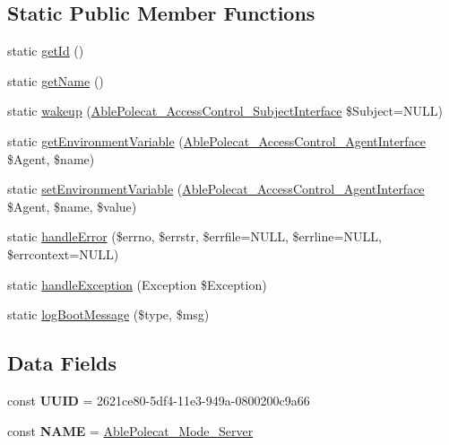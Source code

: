 \subsection*{Static Public Member Functions}
\begin{DoxyCompactItemize}
\item 
static \hyperlink{class_able_polecat___mode___server_acfaa3a96d0cb5a4c0d4d710dcba41e9e}{get\+Id} ()
\item 
static \hyperlink{class_able_polecat___mode___server_a4ef9bd37ba3ce8a13c1e8bcf4f72a630}{get\+Name} ()
\item 
static \hyperlink{class_able_polecat___mode___server_a3f2135f6ad45f51d075657f6d20db2cd}{wakeup} (\hyperlink{interface_able_polecat___access_control___subject_interface}{Able\+Polecat\+\_\+\+Access\+Control\+\_\+\+Subject\+Interface} \$Subject=N\+U\+L\+L)
\item 
static \hyperlink{class_able_polecat___mode___server_a04e7e0f41da8037ae797868b61b6df77}{get\+Environment\+Variable} (\hyperlink{interface_able_polecat___access_control___agent_interface}{Able\+Polecat\+\_\+\+Access\+Control\+\_\+\+Agent\+Interface} \$Agent, \$name)
\item 
static \hyperlink{class_able_polecat___mode___server_a68bdefd00518f09963ea3fa95cd2a242}{set\+Environment\+Variable} (\hyperlink{interface_able_polecat___access_control___agent_interface}{Able\+Polecat\+\_\+\+Access\+Control\+\_\+\+Agent\+Interface} \$Agent, \$name, \$value)
\item 
static \hyperlink{class_able_polecat___mode___server_aefd1705bf4d05f2c642eaeb400639367}{handle\+Error} (\$errno, \$errstr, \$errfile=N\+U\+L\+L, \$errline=N\+U\+L\+L, \$errcontext=N\+U\+L\+L)
\item 
static \hyperlink{class_able_polecat___mode___server_a7e7be427ff1899a7386be4019db2d59d}{handle\+Exception} (Exception \$Exception)
\item 
static \hyperlink{class_able_polecat___mode___server_a049626e8b9364098553ee05897b55111}{log\+Boot\+Message} (\$type, \$msg)
\end{DoxyCompactItemize}
\subsection*{Data Fields}
\begin{DoxyCompactItemize}
\item 
\hypertarget{class_able_polecat___mode___server_a74b892c8c0b86bf9d04c5819898c51e7}{}const {\bfseries U\+U\+I\+D} = \textquotesingle{}2621ce80-\/5df4-\/11e3-\/949a-\/0800200c9a66\textquotesingle{}\label{class_able_polecat___mode___server_a74b892c8c0b86bf9d04c5819898c51e7}

\item 
\hypertarget{class_able_polecat___mode___server_a244352f035b82b20b0efa506167fd862}{}const {\bfseries N\+A\+M\+E} = \textquotesingle{}\hyperlink{class_able_polecat___mode___server}{Able\+Polecat\+\_\+\+Mode\+\_\+\+Server}\textquotesingle{}\label{class_able_polecat___mode___server_a244352f035b82b20b0efa506167fd862}

\end{DoxyCompactItemize}
